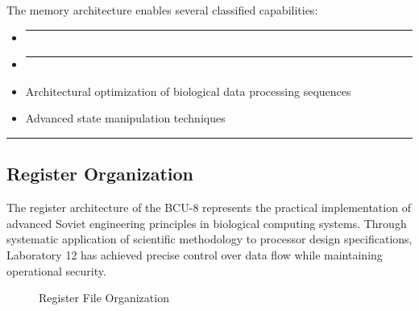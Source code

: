 \documentclass[12pt]{article}
\begin{document}
The memory architecture enables several classified capabilities:
\begin{itemize}
    \item \rule{70mm}{3.5mm}
    \item \rule{50mm}{3.5mm}
    \item Architectural optimization of biological data processing sequences
    \item Advanced state manipulation techniques
\end{itemize}

\begin{center}
\textcolor{sovietred}{\rule{0.8\textwidth}{0.4pt}}
\end{center}

\subsection{Register Organization}
The register architecture of the BCU-8 represents the practical implementation of advanced Soviet engineering principles in biological computing systems. Through systematic application of scientific methodology to processor design specifications, Laboratory 12 has achieved precise control over data flow while maintaining operational security.

\begin{figure}[h]
\centering
{}
\caption{Register File Organization}
\end{figure}
\end{document}
